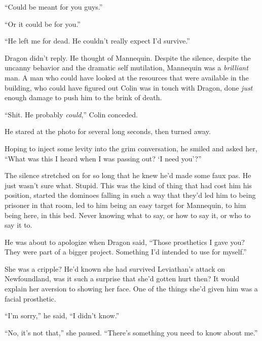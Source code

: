 ``Could be meant for you guys.''



``Or it could be for you.''



``He left me for dead. He couldn't really expect I'd survive.''



Dragon didn't reply.  He thought of Mannequin.  Despite the silence, despite the uncanny behavior and the dramatic self mutilation, Mannequin was a \emph{brilliant} man.  A man who could have looked at the resources that were available in the building, who could have figured out Colin was in touch with Dragon, done \emph{just} enough damage to push him to the brink of death.



``Shit.  He probably\emph{ could},'' Colin conceded.



He stared at the photo for several long seconds, then turned away.



Hoping to inject some levity into the grim conversation, he smiled and asked her, ``What was this I heard when I was passing out?  `I need you'?''



The silence stretched on for so long that he knew he'd made some faux pas.  He just wasn't sure what.  Stupid.  This was the kind of thing that had cost him his position, started the dominoes falling in such a way that they'd led him to being prisoner in that room, led to him being an easy target for Mannequin, to him being here, in this bed.  Never knowing what to say, or how to say it, or who to say it to.



He was about to apologize when Dragon said, ``Those prosthetics I gave you?  They were part of a bigger project.  Something I'd intended to use for myself.''



She was a cripple?  He'd known she had survived Leviathan's attack on Newfoundland, was it such a surprise that she'd gotten hurt then?  It would explain her aversion to showing her face.  One of the things she'd given him was a facial prosthetic.



``I'm sorry,'' he said, ``I didn't know.''



``No, it's not that,'' she paused.  ``There's something you need to know about me.''





